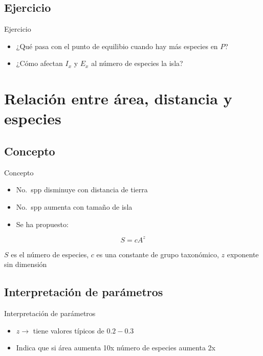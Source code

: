 \documentclass[
  11pt,
  ignorenonframetext,
]{beamer}
\begin{document}
\hypertarget{ejercicio-1}{%
\subsection{Ejercicio}\label{ejercicio-1}}

\begin{frame}{Ejercicio}
\begin{itemize}
\item
  ¿Qué pasa con el punto de equilibio cuando hay más especies en \(P\)?
\item
  ¿Cómo afectan \(I_x\) y \(E_x\) al número de especies la isla?
\end{itemize}
\end{frame}

\hypertarget{relaciuxf3n-entre-uxe1rea-distancia-y-especies}{%
\section{Relación entre área, distancia y
especies}\label{relaciuxf3n-entre-uxe1rea-distancia-y-especies}}

\hypertarget{concepto}{%
\subsection{Concepto}\label{concepto}}

\begin{frame}{Concepto}
\begin{itemize}
\item
  No.~spp disminuye con distancia de tierra
\item
  No.~spp aumenta con tamaño de isla
\item
  Se ha propuesto:
\end{itemize}

\[S = cA^z\]

\(S\) es el número de especies, \(c\) es una constante de grupo
taxonómico, \(z\) exponente sin dimensión
\end{frame}

\hypertarget{interpretaciuxf3n-de-paruxe1metros}{%
\subsection{Interpretación de
parámetros}\label{interpretaciuxf3n-de-paruxe1metros}}

\begin{frame}{Interpretación de parámetros}
\begin{itemize}
\item
  \(z \rightarrow\) tiene valores típicos de \(0.2-0.3\)
\item
  Indica que si área aumenta 10x número de especies aumenta 2x
\end{itemize}
\end{frame}
\end{document}
